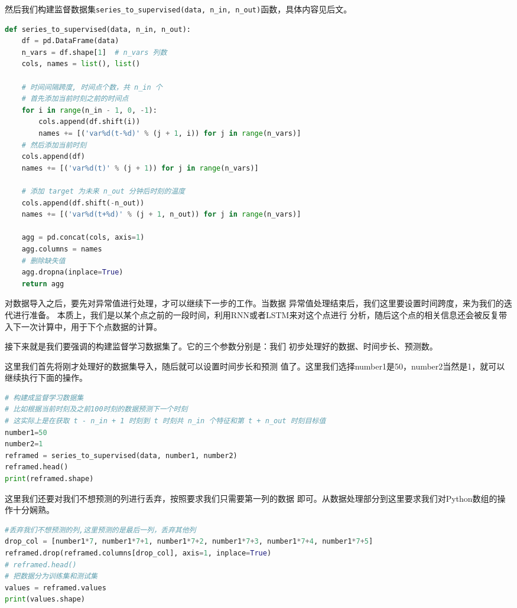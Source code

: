 \documentclass[11pt,a4paper]{elegantpaper}
\begin{document}
\begin{multicols}{2}
然后我们构建监督数据集\lstinline{series_to_supervised(data, n_in, n_out)}函数，具体内容见后文。

\begin{lstlisting}[language=Python]
def series_to_supervised(data, n_in, n_out):
    df = pd.DataFrame(data)
    n_vars = df.shape[1]  # n_vars 列数
    cols, names = list(), list()
    
    # 时间间隔跨度, 时间点个数，共 n_in 个
    # 首先添加当前时刻之前的时间点
    for i in range(n_in - 1, 0, -1):
        cols.append(df.shift(i))
        names += [('var%d(t-%d)' % (j + 1, i)) for j in range(n_vars)]
    # 然后添加当前时刻
    cols.append(df)
    names += [('var%d(t)' % (j + 1)) for j in range(n_vars)]

    # 添加 target 为未来 n_out 分钟后时刻的温度
    cols.append(df.shift(-n_out))
    names += [('var%d(t+%d)' % (j + 1, n_out)) for j in range(n_vars)]

    agg = pd.concat(cols, axis=1)
    agg.columns = names
    # 删除缺失值
    agg.dropna(inplace=True)
    return agg
\end{lstlisting}

对数据导入之后，要先对异常值进行处理，才可以继续下一步的工作。当数据
异常值处理结束后，我们这里要设置时间跨度，来为我们的迭代进行准备。
本质上，我们是以某个点之前的一段时间，利用RNN或者LSTM来对这个点进行
分析，随后这个点的相关信息还会被反复带入下一次计算中，用于下个点数据的计算。

接下来就是我们要强调的构建监督学习数据集了。它的三个参数分别是：我们
初步处理好的数据、时间步长、预测数。

这里我们首先将刚才处理好的数据集导入，随后就可以设置时间步长和预测
值了。这里我们选择number1是50，number2当然是1，就可以继续执行下面的操作。

\begin{lstlisting}[language=Python]
# 构建成监督学习数据集
# 比如根据当前时刻及之前100时刻的数据预测下一个时刻
# 这实际上是在获取 t - n_in + 1 时刻到 t 时刻共 n_in 个特征和第 t + n_out 时刻目标值
number1=50
number2=1
reframed = series_to_supervised(data, number1, number2)
reframed.head()
print(reframed.shape)
\end{lstlisting}

这里我们还要对我们不想预测的列进行丢弃，按照要求我们只需要第一列的数据
即可。从数据处理部分到这里要求我们对Python数组的操作十分娴熟。

\begin{lstlisting}[language=Python]
#丢弃我们不想预测的列,这里预测的是最后一列，丢弃其他列
drop_col = [number1*7, number1*7+1, number1*7+2, number1*7+3, number1*7+4, number1*7+5]
reframed.drop(reframed.columns[drop_col], axis=1, inplace=True)
# reframed.head()
# 把数据分为训练集和测试集
values = reframed.values
print(values.shape)
\end{lstlisting}


\end{multicols}
\end{document}
